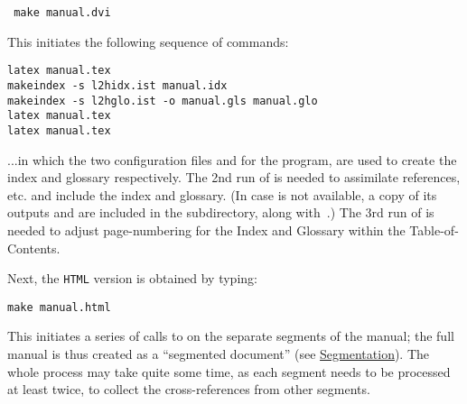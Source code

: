 \begin{itemize}
\begin{small}
\texttt{ make manual.dvi}
\end{small}

\noindent
This initiates the following sequence of commands:
\begin{small}
\begin{verbatim}
latex manual.tex
makeindex -s l2hidx.ist manual.idx
makeindex -s l2hglo.ist -o manual.gls manual.glo
latex manual.tex
latex manual.tex
\end{verbatim}
\end{small}
%
%
...in which the two configuration files  and 
for the  program, are used to create the index and glossary respectively.
The 2nd run of  is needed to assimilate references, etc.
and include the index and glossary.\html{\\}%
%
\html{\\}
(In case  is not available, a copy of its outputs 
and  are included in the  subdirectory,
along with \,.)\html{\\}
The 3rd run of  is needed to adjust page-numbering for the Index
and Glossary within the Table-of-Contents.

\noindent
Next, the \texttt{HTML} version is obtained by typing:

\begin{small}
\texttt{make manual.html}
\end{small}

\noindent
This initiates a series of calls to \latextohtml{} on the separate
segments of the manual;
the full manual is thus created as a ``segmented document''
(see \hyperref{a later section}{Section~}{}{Segmentation}).
The whole process may take quite some time,
as each segment needs to be processed at least twice,
to collect the cross-references from other segments.


\end{itemize}
